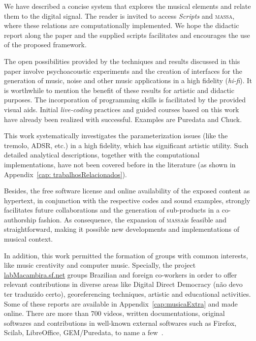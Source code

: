 \documentclass[
 aip,
 jmp,
 amsmath,amssymb,
 reprint,
]{revtex4-1}
\newcommand{\massa}{{\large \textsc{massa}}}
\begin{document}
We have described a concise system that explores the musical elements and relate them to the digital signal. The reader is invited to access \emph{Scripts} and \massa, where these relations are computationally implemented. We hope the didactic report along the paper and the supplied scripts facilitates and encourages the use of the proposed framework. 

The open possibilities provided by the techniques and results discussed in this paper involve psychoacoustic experiments and the creation of interfaces for the generation of music, noise and other music applications in a high fidelity (\emph{hi-fi}). It is worthwhile to mention the benefit of these results for artistic and didactic purposes. The incorporation of programming skills is facilitated by the provided visual aids. Initial \emph{live-coding} practices and guided courses based on this work have already been realized with successful. Examples are Puredata and Chuck.

This work systematically investigates the parameterization issues (like the tremolo, ADSR, etc.) in a high fidelity, which has significant artistic utility. Such detailed analytical descriptions, together with the computational implementations, have not been covered before in the literature (as shown in Appendix~\ref{cap: trabalhosRelacionados}). 

Besides, the free software license and online availability of the exposed content as hypertext, in conjunction with the respective codes and sound examples, strongly facilitates future collaborations and the generation of sub-products in a co-authorship fashion. As consequence, the expansion of \massa is feasible and straightforward, making it possible new developments and implementations of musical context.

In addition, this work permitted the formation of groups with common interests, like music creativity and computer music. Specially, the project \url{labMacambira.sf.net} groups Brazilian and foreign co-workers in order to offer relevant contributions in diverse areas like Digital Direct Democracy (não devo ter traduzido certo), georeferencing techniques, artistic and educational activities. Some of these reports are available in Appendix~\ref{cap:musicaExtra} and made online. There are more than 700 videos, written documentations, original softwares and contributions in well-known external softwares such as Firefox, Scilab, LibreOffice, GEM/Puredata, to name a few~\cite{siteLM,wikiLM,vimeoLM}.       
\end{document}
